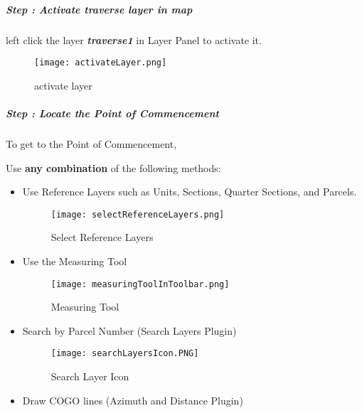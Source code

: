 
\subparagraph*{{\LARGE Step \thestepCount:} Activate traverse layer in map}
\vspace{.2in}

\vspace{.2in}

 left click the layer \textbf {\emph{traverse1}} in Layer Panel to activate it.
\vspace{.2in}

\begin{figure}[H] %
\centering
    \texttt{[image: activateLayer.png]}
\vspace{-.1in}

\caption{activate layer}
\end{figure}

\clearpage


\subparagraph*{{\LARGE Step \thestepCount:} Locate the Point of Commencement}
\vspace{.2in}

\noindent To get to the Point of Commencement,
\vspace{.2in}

\noindent Use \textbf{any combination} of the following methods:
\vspace{.2in}

\begin{itemize}
\item{Use Reference Layers such as Units, Sections, Quarter Sections, and Parcels.

  \begin{figure}[H]
  \centering
  \texttt{[image: selectReferenceLayers.png]}
  \vspace{-.1in}

  \caption{Select Reference Layers}
  \end{figure}
}
\item{Use the Measuring Tool

  \begin{figure}[H]
  \centering
      \texttt{[image: measuringToolInToolbar.png]}
  \vspace{-.2in}

  \caption{Measuring Tool}
  \end{figure}
}
\vspace{.3in}

\item{Search by Parcel Number \small(Search Layers Plugin)\\
\begin{figure}[H]
\centering
    \texttt{[image: searchLayersIcon.PNG]}
\caption{Search Layer Icon}
\end{figure}
}
\item{Draw COGO lines \small(Azimuth and Distance Plugin)}
\end{itemize}
\clearpage

